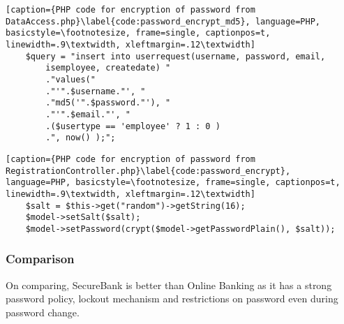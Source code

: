 \begin{lstlisting}[caption={PHP code for encryption of password from DataAccess.php}\label{code:password_encrypt_md5}, language=PHP, basicstyle=\footnotesize, frame=single, captionpos=t, linewidth=.9\textwidth, xleftmargin=.12\textwidth]
    $query = "insert into userrequest(username, password, email,
        isemployee, createdate) "
        ."values("
        ."'".$username."', "
        ."md5('".$password."'), "
        ."'".$email."', "
        .($usertype == 'employee' ? 1 : 0 )
        .", now() );";
\end{lstlisting}

\begin{lstlisting}[caption={PHP code for encryption of password from RegistrationController.php}\label{code:password_encrypt}, language=PHP, basicstyle=\footnotesize, frame=single, captionpos=t, linewidth=.9\textwidth, xleftmargin=.12\textwidth]
    $salt = $this->get("random")->getString(16);
    $model->setSalt($salt);
    $model->setPassword(crypt($model->getPasswordPlain(), $salt));
\end{lstlisting}

\subsubsection{Comparison}
On comparing, SecureBank is better than Online Banking as it has a strong password policy, lockout mechanism and restrictions on password even during password change.
\clearpage